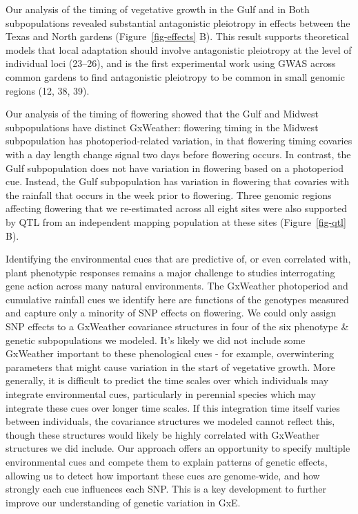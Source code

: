 \documentclass[
  9pt,
  twocolumn,
  twoside]{pnas-new}
\begin{document}
Our analysis of the timing of vegetative growth in the Gulf and in Both
subpopulations revealed substantial antagonistic pleiotropy in effects
between the Texas and North gardens (Figure~\ref{fig-effects} B). This
result supports theoretical models that local adaptation should involve
antagonistic pleiotropy at the level of individual loci (23--26), and is
the first experimental work using GWAS across common gardens to find
antagonistic pleiotropy to be common in small genomic regions (12, 38,
39).

Our analysis of the timing of flowering showed that the Gulf and Midwest
subpopulations have distinct GxWeather: flowering timing in the Midwest
subpopulation has photoperiod-related variation, in that flowering
timing covaries with a day length change signal two days before
flowering occurs. In contrast, the Gulf subpopulation does not have
variation in flowering based on a photoperiod cue. Instead, the Gulf
subpopulation has variation in flowering that covaries with the rainfall
that occurs in the week prior to flowering. Three genomic regions
affecting flowering that we re-estimated across all eight sites were
also supported by QTL from an independent mapping population at these
sites (Figure~\ref{fig-qtl} B).

Identifying the environmental cues that are predictive of, or even
correlated with, plant phenotypic responses remains a major challenge to
studies interrogating gene action across many natural environments. The
GxWeather photoperiod and cumulative rainfall cues we identify here are
functions of the genotypes measured and capture only a minority of SNP
effects on flowering. We could only assign SNP effects to a GxWeather
covariance structures in four of the six phenotype \& genetic
subpopulations we modeled. It's likely we did not include some GxWeather
important to these phenological cues - for example, overwintering
parameters that might cause variation in the start of vegetative growth.
More generally, it is difficult to predict the time scales over which
individuals may integrate environmental cues, particularly in perennial
species which may integrate these cues over longer time scales. If this
integration time itself varies between individuals, the covariance
structures we modeled cannot reflect this, though these structures would
likely be highly correlated with GxWeather structures we did include.
Our approach offers an opportunity to specify multiple environmental
cues and compete them to explain patterns of genetic effects, allowing
us to detect how important these cues are genome-wide, and how strongly
each cue influences each SNP. This is a key development to further
improve our understanding of genetic variation in GxE.
\end{document}

